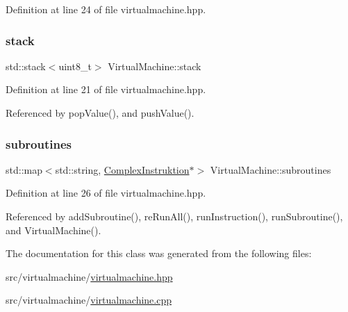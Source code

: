 Definition at line 24 of file virtualmachine.\+hpp.

\mbox{\label{class_virtual_machine_a3a4c8cdda0913c9c0cdc75df23ac7cbb}} 
\subsubsection{\texorpdfstring{stack}{stack}}
{\footnotesize\ttfamily std\+::stack$<$uint8\+\_\+t$>$ Virtual\+Machine\+::stack\hspace{0.3cm}{\ttfamily [private]}}



Definition at line 21 of file virtualmachine.\+hpp.



Referenced by pop\+Value(), and push\+Value().

\mbox{\label{class_virtual_machine_a91f5b9cfc45eaea5ce95b659705b2803}} 
\subsubsection{\texorpdfstring{subroutines}{subroutines}}
{\footnotesize\ttfamily std\+::map$<$std\+::string, \mbox{\hyperlink{class_complex_instruktion}{Complex\+Instruktion}}$\ast$$>$ Virtual\+Machine\+::subroutines\hspace{0.3cm}{\ttfamily [private]}}



Definition at line 26 of file virtualmachine.\+hpp.



Referenced by add\+Subroutine(), re\+Run\+All(), run\+Instruction(), run\+Subroutine(), and Virtual\+Machine().



The documentation for this class was generated from the following files\+:\begin{DoxyCompactItemize}
\item 
src/virtualmachine/\mbox{\hyperlink{virtualmachine_8hpp}{virtualmachine.\+hpp}}\item 
src/virtualmachine/\mbox{\hyperlink{virtualmachine_8cpp}{virtualmachine.\+cpp}}\end{DoxyCompactItemize}
